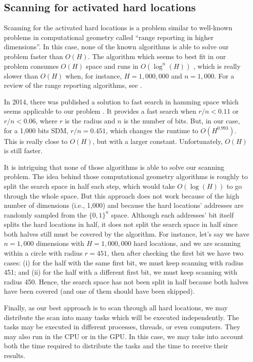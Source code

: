 \subsection{Scanning for activated hard locations}

Scanning for the activated hard locations is a problem similar to well-known problems in computational geometry called ``range reporting in higher dimensions''. In this case, none of the known algorithms is able to solve our problem faster than $O(H)$. The algorithm which seems to best fit in our problem consumes $O(H)$ space and runs in $O(\log^n(H))$ \citep{chazelle1988functional}, which is really slower than $O(H)$ when, for instance, $H=1,000,000$ and $n=1,000$. For a review of the range reporting algorithms, see \citet{chan2011orthogonal}.

In 2014, there was published a solution to fast search in hamming space which seems applicable to our problem \citet{norouzi2014fast}. It provides a fast search when $r/n < 0.11$ or $r/n < 0.06$, where $r$ is the radius and $n$ is the number of bits. But, in our case, for a 1,000 bits SDM, $r/n = 0.451$, which changes the runtime to $O(H^{0.993})$. This is really close to $O(H)$, but with a larger constant. Unfortunately, $O(H)$ is still faster.

It is intriguing that none of those algorithms is able to solve our scanning problem. The idea behind those computational geometry algorithms is roughly to split the search space in half each step, which would take $O(\log(H))$ to go through the whole space. But this approach does not work because of the high number of dimensions (i.e., 1,000) and because the hard locations' addresses are randomly sampled from the $\{0, 1\}^n$ space. Although each addresses' bit itself splits the hard locations in half, it does not split the search space in half since both halves still must be covered by the algorithm. For instance, let's say we have $n=1,000$ dimensions with $H=1,000,000$ hard locations, and we are scanning within a circle with radius $r=451$, then after checking the first bit we have two cases: (i) for the half with the same first bit, we must keep scanning with radius 451; and (ii) for the half with a different first bit, we must keep scanning with radius 450. Hence, the search space has not been split in half because both halves have been covered (and one of them should have been skipped).

Finally, as our best approach is to scan through all hard locations, we may distribute the scan into many tasks which will be executed independently. The tasks may be executed in different processes, threads, or even computers. They may also run in the CPU or in the GPU. In this case, we may take into account both the time required to distribute the tasks and the time to receive their results.

